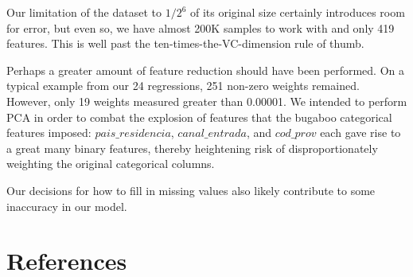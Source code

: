 \documentclass{report}
\begin{document}
Our limitation of the dataset to $1/2^6$ of its original size certainly introduces room for error, but even so, we have almost 200K samples to work with and only 419 features. This is well past the ten-times-the-VC-dimension rule of thumb.

Perhaps a greater amount of feature reduction should have been performed. On a typical example from our 24 regressions, 251 non-zero weights remained. However, only 19 weights measured greater than 0.00001. We intended to perform PCA in order to combat the explosion of features that the bugaboo categorical features imposed: $pais\_residencia$, $canal\_entrada$, and $cod\_prov$ each gave rise to a great many binary features, thereby heightening risk of disproportionately weighting the original categorical columns.

Our decisions for how to fill in missing values also likely contribute to some inaccuracy in our model.

\section{References}
\end{document}
